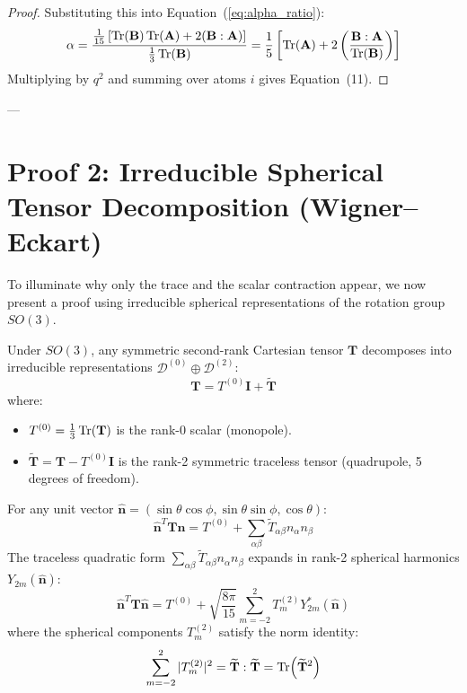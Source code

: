 \documentclass[11pt,a4paper]{article}
\theoremstyle{definition}
\begin{document}
\begin{proof}
Substituting this into Equation~(\ref{eq:alpha_ratio}):
\begin{equation}
\alpha = \frac{\frac{1}{15} \left[ \Tr(\mathbf{B})\Tr(\mathbf{A}) + 2 (\mathbf{B}:\mathbf{A}) \right]}{\frac{1}{3}\Tr(\mathbf{B})} = \frac{1}{5} \left[ \Tr(\mathbf{A}) + 2 \left( \frac{\mathbf{B}:\mathbf{A}}{\Tr(\mathbf{B})} \right) \right]
\end{equation}
Multiplying by $q^2$ and summing over atoms $i$ gives Equation~(11).
\end{proof}

---

\section{Proof 2: Irreducible Spherical Tensor Decomposition (Wigner--Eckart)}
\label{sec:proof2}

To illuminate why only the trace and the scalar contraction appear, we now present a proof using irreducible spherical representations of the rotation group $SO(3)$.

Under $SO(3)$, any symmetric second-rank Cartesian tensor $\mathbf{T}$ decomposes into irreducible representations $\mathcal{D}^{(0)} \oplus \mathcal{D}^{(2)}$:
\begin{equation}
\mathbf{T} = T^{(0)} \mathbf{I} + \widetilde{\mathbf{T}}
\end{equation}
where:
\begin{itemize}
    \item $T^{(0)} = \frac{1}{3}\Tr(\mathbf{T})$ is the rank-0 scalar (monopole).
    \item $\widetilde{\mathbf{T}} = \mathbf{T} - T^{(0)}\mathbf{I}$ is the rank-2 symmetric traceless tensor (quadrupole, 5 degrees of freedom).
\end{itemize}

For any unit vector $\hat{\mathbf{n}} = (\sin\theta\cos\phi, \sin\theta\sin\phi, \cos\theta)$:
\begin{equation}
\hat{\mathbf{n}}^T \mathbf{T} \hat{\mathbf{n}} = T^{(0)} + \sum_{\alpha\beta} \widetilde{T}_{\alpha\beta} n_\alpha n_\beta
\end{equation}
The traceless quadratic form $\sum_{\alpha\beta} \widetilde{T}_{\alpha\beta} n_\alpha n_\beta$ expands in rank-2 spherical harmonics $Y_{2m}(\hat{\mathbf{n}})$:
\begin{equation}
\hat{\mathbf{n}}^T \mathbf{T} \hat{\mathbf{n}} = T^{(0)} + \sqrt{\frac{8\pi}{15}} \sum_{m=-2}^2 T^{(2)}_m Y_{2m}^*(\hat{\mathbf{n}})
\end{equation}
where the spherical components $T^{(2)}_m$ satisfy the norm identity:
\begin{equation}
\sum_{m=-2}^2 |T^{(2)}_m|^2 = \widetilde{\mathbf{T}} : \widetilde{\mathbf{T}} = \Tr(\widetilde{\mathbf{T}}^2)
\end{equation}
\end{document}

